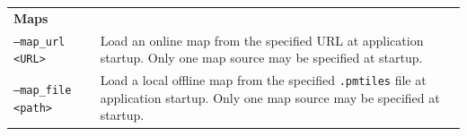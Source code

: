 \begin{longtable}{p{} p{}}
    \multicolumn{2}{l}{\textbf{Maps}} \\

    \texttt{--map\_url <URL>} &
        Load an online map from the specified URL at application startup. Only one map source may be specified at startup. \\

    \texttt{--map\_file <path>} &
        Load a local offline map from the specified \texttt{.pmtiles}
        file at application startup. Only one map source may be specified at startup. \\

\end{longtable}
